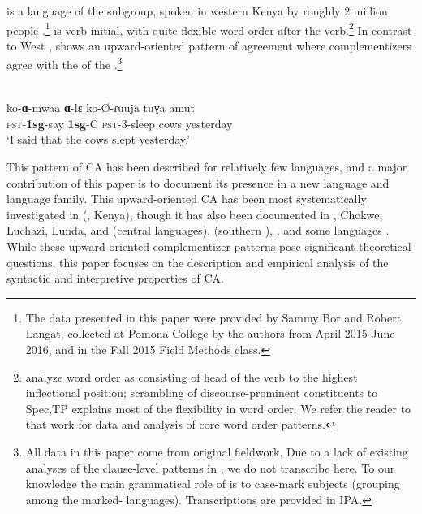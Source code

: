 \documentclass[output=paper
,newtxmath
,modfonts
,nonflat]{langsci/langscibook}
\begin{document}
 is a  language of the  subgroup, spoken in western Kenya by roughly 2 million people \autocite{Lewis:2016}.\footnote{The data presented in this paper were provided by Sammy Bor and Robert Langat, collected at Pomona College by the authors from April 2015-June 2016, and in the Fall 2015 Field Methods class.}  is verb initial, with quite flexible word order after the verb.\footnote{\citet{Diercks:2016b} analyze  word order as consisting of head  of the verb to the highest inflectional position;  scrambling of discourse-prominent constituents  to Spec,TP explains most of the flexibility in word order. We refer the reader to that work for data and analysis of  core word order patterns.} In contrast to West ,  shows an upward-oriented pattern of agreement where complementizers agree with the  of the .\footnote{All  data in this paper come from original fieldwork. Due to a lack of existing analyses of the clause-level  patterns in , we do not transcribe  here. To our knowledge the main grammatical role of  is to case-mark  subjects (grouping  among the marked-  languages). Transcriptions are provided in IPA.} 

\ea \label{ex:Diercks,Rao:2}
 \\
\gll	ko-\textbf{ɑ}-mwaa \textbf{ɑ}-lɛ ko-\O-ɾuuja tuɣa amut \\
\textsc{pst}-\textbf{1sg}-say \textbf{1sg}-C \textsc{pst}-3-sleep cows yesterday \\
\glt `I said that the cows slept yesterday.'
\z

\noindent This pattern of CA has been described for relatively few languages, and a major contribution of this paper is to document its presence in a new language and language family. This upward-oriented CA has been most systematically investigated in  (, Kenya), though it has also been documented in , Chokwe, Luchazi, Lunda, and  (central  languages),  (southern ), , and some  languages \citep{Baker:2008b,Diercks:2013,Kawasha:2007,Idiatov:2010,Torrence:2016,LetsholoSafir:2017}. While these upward-oriented complementizer patterns pose significant theoretical questions, this paper focuses on the  description and empirical analysis of the syntactic and interpretive properties of  CA. 
\end{document}
